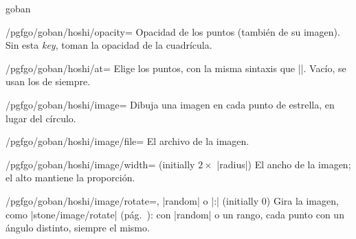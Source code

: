 \begin{environment}{{goban}}
	\begin{key}{/pgfgo/goban/hoshi/opacity=}
		Opacidad de los puntos (también de su imagen). Sin esta \emph{key}, toman la opacidad de la cuadrícula.

		\begin{codeexample}[]
			\begin{goban}[9, hoshi = {radius = 3pt, opacity = 0.3}]
			\end{goban}
		\end{codeexample}
	\end{key}

	\begin{key}{/pgfgo/goban/hoshi/at=}
		Elige los puntos, con la misma sintaxis que |\stones|. Vacío, se usan los de siempre.

		\begin{codeexample}[]
			\begin{goban}[9, hoshi = {at = {C3, G7}}]
			\end{goban}
		\end{codeexample}
	\end{key}
	
	\begin{key}{/pgfgo/goban/hoshi/image=}
		Dibuja una imagen en cada punto de estrella, en lugar del círculo.

		\begin{codeexample}[]
			\begin{goban}[9, hoshi = {image = {file = pgfgo-hoshi.png}, radius = 3pt}]
			\end{goban}
		\end{codeexample}
	\end{key}

	\begin{key}{/pgfgo/goban/hoshi/image/file=}
		El archivo de la imagen.
	\end{key}

	\begin{key}{/pgfgo/goban/hoshi/image/width= (initially $2 \times$ |radius|)}
		El ancho de la imagen; el alto mantiene la proporción.
	\end{key}

	\begin{key}{/pgfgo/goban/hoshi/image/rotate=, |random| o |:| (initially 0)}
		Gira la imagen, como |stone/image/rotate| (pág.~\pageref{subsec:piedrasimagen}): con |random| o un rango, cada punto con un ángulo distinto, siempre el mismo.


\end{key}
\end{environment}
